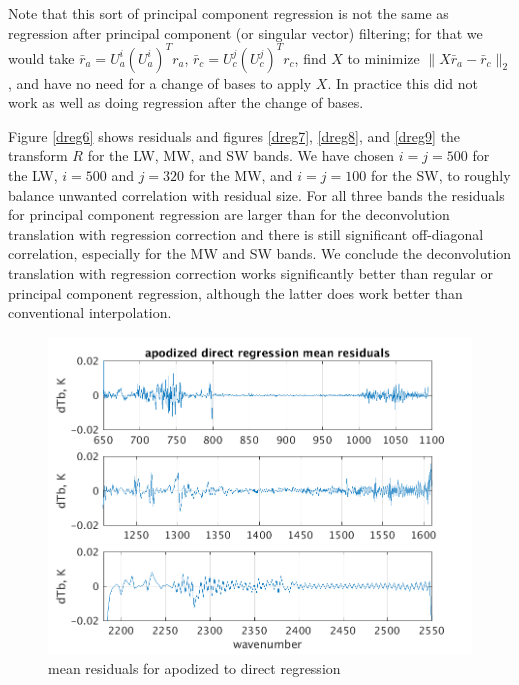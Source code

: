 \documentclass[10pt,twocolumn]{article}  %
\begin{document}
Note that this sort of principal component regression is not the
same as regression after principal component (or singular vector)
filtering; for that we would take $\bar r_a = U_a^i (U_a^i)^T r_a$,
$\bar r_c = U_c^j (U_c^j)^T r_c$, find $X$ to minimize $\|X \bar r_a
- \bar r_c\|_2$, and have no need for a change of bases to apply
$X$.  In practice this did not work as well as doing regression
after the change of bases.

Figure \ref{dreg6} shows residuals and figures \ref{dreg7},
\ref{dreg8}, and \ref{dreg9} the transform $R$ for the {\cris} LW,
MW, and SW bands.  We have chosen $i = j = 500$ for the LW, $i =
500$ and $j = 320$ for the MW, and $i = j = 100$ for the SW, to
roughly balance unwanted correlation with residual size.  For all
three bands the residuals for principal component regression are
larger than for the deconvolution translation with regression
correction and there is still significant off-diagonal correlation,
especially for the MW and SW bands.  We conclude the deconvolution
translation with regression correction works significantly better
than regular or principal component regression, although the latter
does work better than conventional interpolation.

\begin{figure} %
  \centering
  \includegraphics[width=\linewidth]{slackfigs/ap_direct_regr.png}
  \caption{mean residuals for apodized {\airs} to {\cris} direct
    regression}
  \label{dreg1}
\end{figure}
\end{document}
